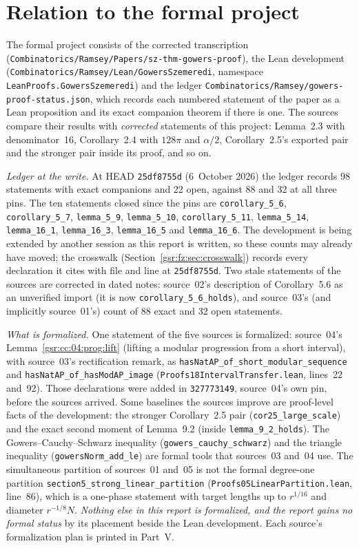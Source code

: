 \documentclass[11pt,letterpaper]{article}
\numberwithin{equation}{section}
\theoremstyle{definition}
\theoremstyle{remark}
\newcommand{\1}{\mathbf 1}
\newcommand{\file}[1]{\nolinkurl{#1}}
\begin{document}
\section{Relation to the formal project}\label{gsr:fm:sec:formal}
The formal project consists of the corrected transcription (\file{Combinatorics/Ramsey/Papers/sz-thm-gowers-proof}), the Lean development (\file{Combinatorics/Ramsey/Lean/GowersSzemeredi}, namespace \texttt{LeanProofs.GowersSzemeredi}) and the ledger \file{Combinatorics/Ramsey/gowers-proof-status.json}, which records each numbered statement of the paper as a Lean proposition and its exact companion theorem if there is one. The sources compare their results with \emph{corrected} statements of this project: Lemma~2.3 with denominator~16, Corollary~2.4 with $128\pi$ and $\alpha/2$, Corollary~2.5's exported pair and the stronger pair inside its proof, and so on.

\emph{Ledger at the write.} At HEAD \texttt{25df8755d} (6~October 2026) the ledger records 98 statements with exact companions and 22 open, against 88 and 32 at all three pins. The ten statements closed since the pins are \file{corollary_5_6}, \file{corollary_5_7}, \file{lemma_5_9}, \file{lemma_5_10}, \file{corollary_5_11}, \file{lemma_5_14}, \file{lemma_16_1}, \file{lemma_16_3}, \file{lemma_16_5} and \file{lemma_16_6}. The development is being extended by another session as this report is written, so these counts may already have moved; the crosswalk (Section~\ref{gsr:fz:sec:crosswalk}) records every declaration it cites with file and line at \texttt{25df8755d}. Two stale statements of the sources are corrected in dated notes: source~02's description of Corollary~5.6 as an unverified import (it is now \file{corollary_5_6_holds}), and source~03's (and implicitly source~01's) count of 88 exact and 32 open statements.

\emph{What is formalized.} One statement of the five sources is formalized: source~04's Lemma~\ref{gsr:cc:04:prog:lift} (lifting a modular progression from a short interval), with source~03's rectification remark, as \file{hasNatAP_of_short_modular_sequence} and \file{hasNatAP_of_hasModAP_image} (\file{Proofs18IntervalTransfer.lean}, lines~22 and~92). Those declarations were added in \texttt{327773149}, source~04's own pin, before the sources arrived. Some baselines the sources improve are proof-level facts of the development: the stronger Corollary~2.5 pair (\file{cor25_large_scale}) and the exact second moment of Lemma~9.2 (inside \file{lemma_9_2_holds}). The Gowers--Cauchy--Schwarz inequality (\file{gowers_cauchy_schwarz}) and the triangle inequality (\file{gowersNorm_add_le}) are formal tools that sources~03 and~04 use. The simultaneous partition of sources~01 and~05 is not the formal degree-one partition \file{section5_strong_linear_partition} (\file{Proofs05LinearPartition.lean}, line~86), which is a one-phase statement with target lengths up to $r^{1/16}$ and diameter $r^{-1/8}N$. \emph{Nothing else in this report is formalized, and the report gains no formal status} by its placement beside the Lean development. Each source's formalization plan is printed in Part~V.
\end{document}
